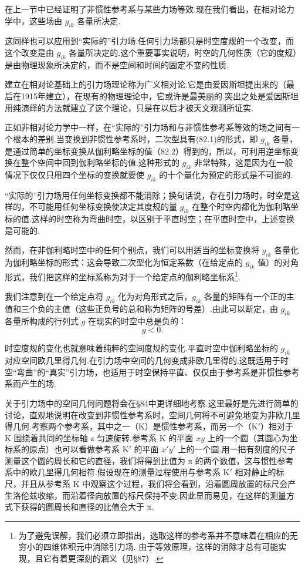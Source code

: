 在上一节中已经证明了非惯性参考系与某些力场等效.现在我们看出，在相对论力学中，这些场由 $g_{ik}$ 各量所决定.

这同样也可以应用到“实际的”引力场.任何引力场都只是时空度规的一个改变，而这个改变是由 $g_{ik}$ 各量所决定的.这个重要事实说明，时空的几何性质（它的度规）是由物理现象所决定的，而不是空间和时间的固定不变的性质.

建立在相对论基础上的引力场理论称为广义相对论.它是由爱因斯坦提出来的（最后在1915年建立），在现有的物理理论中，它或许是最美丽的.突出之处是爱因斯坦用纯演绎的方法就建立了这个理论，只是在以后才被天文观测所证实.

正如非相对论力学中一样，在“实际的”引力场和与非惯性参考系等效的场之间有一个根本的差别.当变换到非惯性参考系时，二次型具有(82.1)的形式，即 $g_{ik}$ 各量，是通过简单的坐标变换从伽利略坐标的值（82.2）得到的，所以，可利用逆坐标变换在整个空间中回到伽利略坐标的值.这种形式的 $g_{ik}$ 非常特殊，这是因为在一般情况下仅仅只用四个坐标的变换就要使 $g_{ik}$ 的十个量化为预定的形式是不可能的.

“实际的”引力场用任何坐标变换都不能消除；换句话说，存在引力场时，时空是这样的，不可能用任何坐标变换使决定其度规的量 $g_{ik}$ 在整个时空内都化为伽利略坐标的值.这样的时空称为弯曲时空，以区别于平直时空；在平直时空中，上述变换是可能的.

然而，在非伽利略时空中的任何个别点，我们可以用适当的坐标变换将 $g_{ik}$ 各量化为伽利略坐标的形式：这会导致二次型化为恒定系数（在给定点的 $g_{ik}$ 值）的对角形式，我们把这样的坐标系称为对于一个给定点的伽利略坐标系\footnote{为了避免误解，我们必须立即指出，选取这样的参考系并不意味着在相应的无穷小的四维体积元中消除引力场. 由于等效原理，这样的消除才总有可能实现，且它有着更深刻的涵义（见§87）.}.

我们注意到在一个给定点将 $g_{ik}$ 化为对角形式之后，$g_{ik}$ 各量的矩阵有一个正的主值和三个负的主值（这些正负号的总和称为矩阵的号差）.由此可以断定，由 $g_{ik}$ 各量所构成的行列式 $g$ 在现实的时空中总是负的：
\begin{equation}
  g<0.
\end{equation}

时空度规的变化也就意味着纯粹的空间度规的变化.平直时空中伽利略坐标的 $g_{ik}$ 对应空间欧几里得几何.在引力场中空间的几何变成非欧几里得的.这既适用于时空“弯曲”的“真实”引力场，也适用于时空保持平直、仅仅由于参考系是非惯性参考系而产生的场.

关于引力场中的空间几何问题将会在§84中更详细地考察.这里最好是先进行简单的讨论，直观地说明在改变到非惯性参考系时，空间几何将不可避免地变为非欧几里得几何.考察两个参考系，其中之一（K）是惯性参考系，而另一个（K$'$）相对于 K 围绕着共同的坐标轴 z 匀速旋转.参考系 K 的平面 $xy$ 上的一个圆（其圆心为坐标系的原点）也可以看做参考系 K$'$ 的平面 $x'y'$ 上的一个圆.用一把有刻度的尺子测量这个圆的周长和它的直径，我们将得到比值为 π 的两个数值，这与惯性参考系中的欧几里得几何相符.假设现在的测量过程使用与参考系 K$'$ 相对静止的标尺，并且从参考系 K 中观察这个过程，我们将会看到，沿着圆周放置的标尺会产生洛伦兹收缩，而沿着径向放置的标尺保持不变.因此显而易见，在这样的测量方式下获得的圆周长和直径的比值会大于 π.

